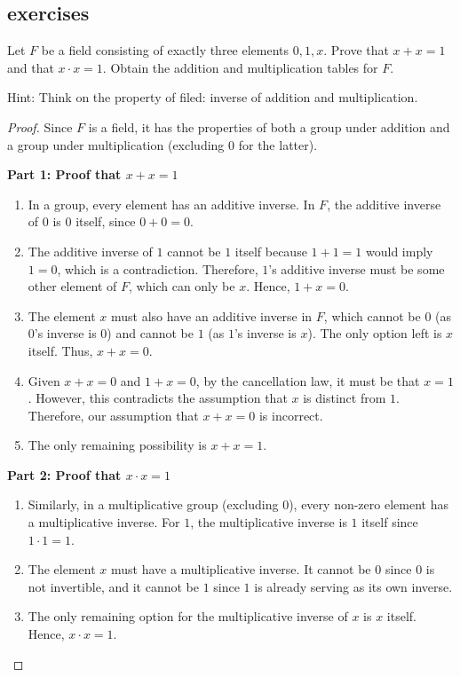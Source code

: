 \subsection{exercises}
\begin{exercise}
    
        Let \( F \) be a field consisting of exactly three elements \( 0, 1, x \). Prove that \( x + x = 1 \) and that \( x \cdot x = 1 \). Obtain the addition and multiplication tables for \( F \).
        
\end{exercise}
    Hint: Think on the property of filed: inverse of addition and multiplication.
    \begin{proof}
        Since \( F \) is a field, it has the properties of both a group under addition and a group under multiplication (excluding \( 0 \) for the latter).
        
        \textbf{Part 1: Proof that \( x + x = 1 \)}
        \begin{enumerate}
            \item In a group, every element has an additive inverse. In \( F \), the additive inverse of \( 0 \) is \( 0 \) itself, since \( 0 + 0 = 0 \).
            \item The additive inverse of \( 1 \) cannot be \( 1 \) itself because \( 1 + 1 = 1 \) would imply \( 1 = 0 \), which is a contradiction. Therefore, \( 1 \)'s additive inverse must be some other element of \( F \), which can only be \( x \). Hence, \( 1 + x = 0 \).
            \item The element \( x \) must also have an additive inverse in \( F \), which cannot be \( 0 \) (as \( 0 \)'s inverse is \( 0 \)) and cannot be \( 1 \) (as \( 1 \)'s inverse is \( x \)). The only option left is \( x \) itself. Thus, \( x + x = 0 \).
            \item Given \( x + x = 0 \) and \( 1 + x = 0 \), by the cancellation law, it must be that \( x = 1 \). However, this contradicts the assumption that \( x \) is distinct from \( 1 \). Therefore, our assumption that \( x + x = 0 \) is incorrect.
            \item The only remaining possibility is \( x + x = 1 \).
        \end{enumerate}
        
        \textbf{Part 2: Proof that \( x \cdot x = 1 \)}
        \begin{enumerate}
            \item Similarly, in a multiplicative group (excluding \( 0 \)), every non-zero element has a multiplicative inverse. For \( 1 \), the multiplicative inverse is \( 1 \) itself since \( 1 \cdot 1 = 1 \).
            \item The element \( x \) must have a multiplicative inverse. It cannot be \( 0 \) since \( 0 \) is not invertible, and it cannot be \( 1 \) since \( 1 \) is already serving as its own inverse.
            \item The only remaining option for the multiplicative inverse of \( x \) is \( x \) itself. Hence, \( x \cdot x = 1 \).
        \end{enumerate}


\end{proof}
